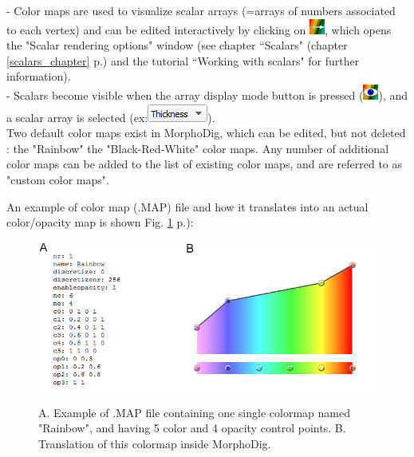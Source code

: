 - Color maps are used to visualize scalar arrays (=arrays of numbers associated to each vertex) and can be edited interactively by
clicking on \includegraphics[scale=0.7]{images/07/colormaps/colormaps.png}, which opens the "Scalar rendering options" window (see chapter
``Scalars" (chapter \ref{scalars_chapter} p.\pageref{scalars_chapter}) and the tutorial ``Working with scalars" for
further information).\\
- Scalars become visible when the array display mode button is pressed (\includegraphics[scale=0.7]{images/04/show_color_scale.png}), and a scalar array is selected (ex:\includegraphics[scale=0.5]{images/04/scalarcombo_scalar.png}).\\
Two default color maps exist in MorphoDig, which can be edited, but not deleted : the "Rainbow" the "Black-Red-White" color maps. Any number of additional color maps can be added to the list of existing color maps, and are referred to as "custom color maps".


An example of color map (.MAP) file and how it translates into an actual color/opacity map is shown Fig. \ref{color_map_example} p.\pageref{color_map_example}):\\

\begin{figure}
  \centering
  \includegraphics[scale=0.5]{images/07/colormaps/example.png}
 \caption{A. Example of .MAP file containing one single colormap named "Rainbow", and having 5 color and 4 opacity control points. B. Translation of this colormap inside MorphoDig.}
\label{color_map_example}
\end{figure}


